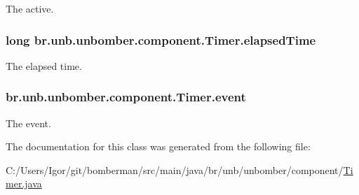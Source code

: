 The active. 

\hypertarget{classbr_1_1unb_1_1unbomber_1_1component_1_1_timer_ac50112dc7d20272d80c32d32019e9b9a}{
\subsubsection[{elapsed\+Time}]{\setlength{\rightskip}{0pt plus 5cm}long br.\+unb.\+unbomber.\+component.\+Timer.\+elapsed\+Time\hspace{0.3cm}{\ttfamily [private]}}}\label{classbr_1_1unb_1_1unbomber_1_1component_1_1_timer_ac50112dc7d20272d80c32d32019e9b9a}


The elapsed time. 

\hypertarget{classbr_1_1unb_1_1unbomber_1_1component_1_1_timer_afb03bb22d0faae22c10461086fa9486e}{
\subsubsection[{event}]{ br.\+unb.\+unbomber.\+component.\+Timer.\+event\hspace{0.3cm}{\ttfamily [private]}}}\label{classbr_1_1unb_1_1unbomber_1_1component_1_1_timer_afb03bb22d0faae22c10461086fa9486e}


The event. 



The documentation for this class was generated from the following file\+:\begin{DoxyCompactItemize}
\item 
C\+:/\+Users/\+Igor/git/bomberman/src/main/java/br/unb/unbomber/component/\hyperlink{_timer_8java}{Timer.\+java}\end{DoxyCompactItemize}
